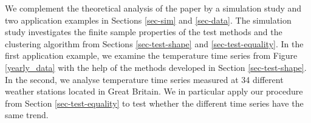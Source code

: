 We complement the theoretical analysis of the paper by a simulation study and two application examples in Sections \ref{sec-sim} and \ref{sec-data}. The simulation study investigates the finite sample properties of the test methods and the clustering algorithm from Sections \ref{sec-test-shape} and \ref{sec-test-equality}. In the first application example, we examine the temperature time series from Figure \ref{yearly_data} with the help of the methods developed in Section \ref{sec-test-shape}. In the second, we analyse temperature time series measured at 34 different weather stations located in Great Britain. We in particular apply our procedure from Section \ref{sec-test-equality} to test whether the different time series have the same trend. 

